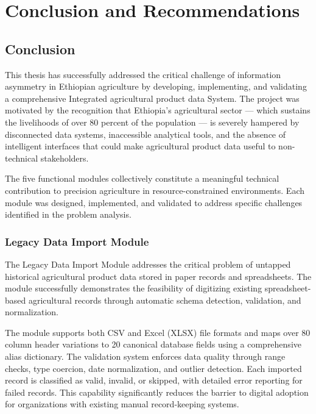
\chapter{Conclusion and Recommendations}

\section{Conclusion}

This thesis has successfully addressed the critical challenge of information asymmetry in Ethiopian agriculture by developing, implementing, and validating a comprehensive Integrated agricultural product data System. The project was motivated by the recognition that Ethiopia's agricultural sector --- which sustains the livelihoods of over 80 percent of the population --- is severely hampered by disconnected data systems, inaccessible analytical tools, and the absence of intelligent interfaces that could make agricultural product data useful to non-technical stakeholders.

The five functional modules collectively constitute a meaningful technical contribution to precision agriculture in resource-constrained environments. Each module was designed, implemented, and validated to address specific challenges identified in the problem analysis.

\subsection{Legacy Data Import Module}

The Legacy Data Import Module addresses the critical problem of untapped historical agricultural product data stored in paper records and spreadsheets. The module successfully demonstrates the feasibility of digitizing existing spreadsheet-based agricultural records through automatic schema detection, validation, and normalization.

The module supports both CSV and Excel (XLSX) file formats and maps over 80 column header variations to 20 canonical database fields using a comprehensive alias dictionary. The validation system enforces data quality through range checks, type coercion, date normalization, and outlier detection. Each imported record is classified as valid, invalid, or skipped, with detailed error reporting for failed records. This capability significantly reduces the barrier to digital adoption for organizations with existing manual record-keeping systems.

